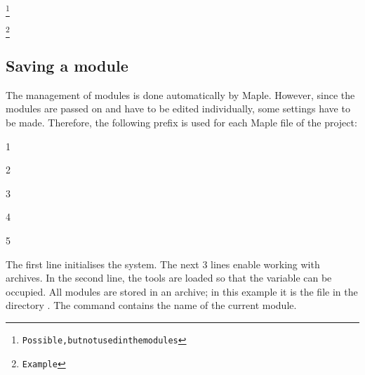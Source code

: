 \begin{alltt} 
 	
 		
 		
     \footnote{Possible, but not used in the modules}
 	           
 		

    
     \footnote{Example }
 		


		
		
 		
\end{alltt}


\newpage
\subsection{Saving a module}

The management of modules is done automatically by Maple. However, since the modules are passed on and have to be edited individually, some settings have to be made. Therefore, the following prefix is used for each Maple file of the project:

1 

2 

3 

4 

5 


The first line initialises the system. The next 3 lines enable working with archives. In the second line, the tools are loaded so that the variable  can be occupied. All modules are stored in an archive; in this example it is the file  in the directory . The command  contains the name of the current module. 

